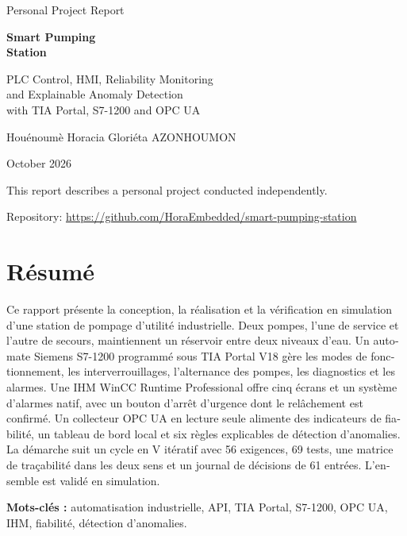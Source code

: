 \documentclass[11pt,a4paper]{report}
\newcommand{\AuthorName}{Houénoumè Horacia Gloriéta AZONHOUMON}
\newcommand{\frontsection}[1]{\chapter*{#1}}
\begin{document}
	
	\begin{titlepage}
		\thispagestyle{empty}
		\centering
		\vspace*{1.5cm}
		{\sffamily\large Personal Project Report\par}
		\vspace{2.2cm}
		{\sffamily\bfseries\fontsize{28}{34}\selectfont Smart Pumping\\ Station\par}
		\vspace{0.8cm}
		{\sffamily\Large PLC Control, HMI, Reliability Monitoring\\and Explainable Anomaly Detection\\[0.3cm]with TIA Portal, S7-1200 and OPC UA\par}
		\vspace{3cm}
		{\Large \AuthorName\par}
		\vspace{0.6cm}
		{\large October 2026\par}
		\vfill
		{\small This report describes a personal project conducted independently.\par}
		\vspace{0.3cm}
		{\footnotesize Repository: \url{https://github.com/HoraEmbedded/smart-pumping-station}\par}
	\end{titlepage}
	
	\pagestyle{plain}
	
	\frontsection{Résumé}
	\begin{otherlanguage}{french}
		Ce rapport présente la conception, la réalisation et la vérification en simulation d'une station de pompage d'utilité industrielle. Deux pompes, l'une de service et l'autre de secours, maintiennent un réservoir entre deux niveaux d'eau. Un automate Siemens S7-1200 programmé sous TIA Portal V18 gère les modes de fonctionnement, les interverrouillages, l'alternance des pompes, les diagnostics et les alarmes. Une IHM WinCC Runtime Professional offre cinq écrans et un système d'alarmes natif, avec un bouton d'arrêt d'urgence dont le relâchement est confirmé. Un collecteur OPC UA en lecture seule alimente des indicateurs de fiabilité, un tableau de bord local et six règles explicables de détection d'anomalies. La démarche suit un cycle en V itératif avec 56 exigences, 69 tests, une matrice de traçabilité dans les deux sens et un journal de décisions de 61 entrées. L'ensemble est validé en simulation.
		
		\medskip\noindent\textbf{Mots-clés :} automatisation industrielle, API, TIA Portal, S7-1200, OPC UA, IHM, fiabilité, détection d'anomalies.
	\end{otherlanguage}
	
\end{document}
